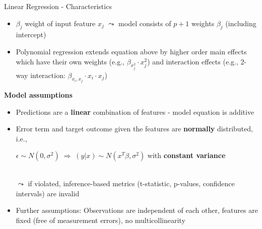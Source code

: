 \documentclass[11pt,compress,t,notes=noshow, aspectratio=169, xcolor=table]{beamer}
\begin{document}
\begin{frame}[c]{Linear Regression - Characteristics}
    \begin{itemize}
        \item $\beta_j$ weight of input feature $x_j$ $\leadsto$ model consists of $p+1$ weights $\beta_j$ (including intercept)
        \item Polynomial regression extends equation above by higher order main effects which have their own weights (e.g., $\beta_{x_j^2} \cdot x_j^2$) and interaction effects (e.g., 2-way interaction: $\beta_{x_i, x_j} \cdot x_i \cdot x_j$)
    \end{itemize}
   \vspace*{0.2cm} 
   \pause
    \textbf{Model assumptions}
    \begin{itemize}
    \item Predictions are a \textbf{linear} combination of features - model equation is additive%
    \item Error term and target outcome given the features are \textbf{normally} distributed, i.e., 
    \centerline{$\epsilon \sim N(0, \sigma^2) \; \Rightarrow \; (y \vert x) \sim N(x^T \beta, \sigma^2)$ with \textbf{constant variance}}\\
    $\leadsto$ if violated, inference-based metrics (t-statistic, p-values, confidence intervals) are invalid
    \item Further assumptions: Observations are independent of each other, features are fixed (free of measurement errors), no multicollinearity

\end{itemize}
\end{frame}
\end{document}
